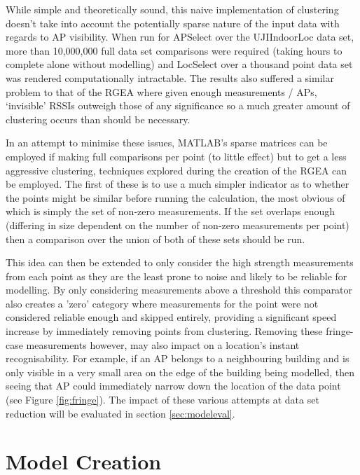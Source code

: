 \documentclass{UoYCSproject}
\begin{document}
	        While simple and theoretically sound, this naive implementation of clustering doesn't take into account the potentially sparse nature of the input data with regards to AP visibility. When run for APSelect over the UJIIndoorLoc data set, more than 10,000,000 full data set comparisons were required (taking hours to complete alone without modelling) and LocSelect over a thousand point data set was rendered computationally intractable. The results also suffered a similar problem to that of the RGEA where given enough measurements / APs, `invisible' RSSIs outweigh those of any significance so a much greater amount of clustering occurs than should be necessary.
	        
	        In an attempt to minimise these issues, MATLAB's sparse matrices can be employed if making full comparisons per point (to little effect) but to get a less aggressive clustering, techniques explored during the creation of the RGEA can be employed. The first of these is to use a much simpler indicator as to whether the points might be similar before running the calculation, the most obvious of which is simply the set of non-zero measurements. If the set overlaps enough (differing in size dependent on the number of non-zero measurements per point) then a comparison over the union of both of these sets should be run.
	        
	        This idea can then be extended to only consider the high strength measurements from each point as they are the least prone to noise and likely to be reliable for modelling. By only considering measurements above a threshold this comparator also creates a 'zero' category where measurements for the point were not considered reliable enough and skipped entirely, providing a significant speed increase by immediately removing points from clustering. Removing these fringe-case measurements however, may also impact on a location's instant recognisability. For example, if an AP belongs to a neighbouring building and is only visible in a very small area on the edge of the building being modelled, then seeing that AP could immediately narrow down the location of the data point (see Figure \ref{fig:fringe}). The impact of these various attempts at data set reduction will be evaluated in section \ref{sec:modeleval}.
		
		\section{Model Creation}
        \label{sec:modelcreation}
        
\end{document}
